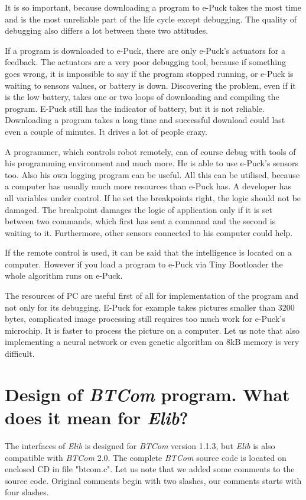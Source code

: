 	It is so important, because downloading a program to e-Puck takes the most time and is the most 
	unreliable part of the life cycle except debugging.
	The quality of debugging also differs a lot between these two attitudes.
	 
	If a program is downloaded to e-Puck, there are only e-Puck's actuators for a feedback.
	The actuators are a very poor debugging tool, because if something goes wrong, 
	it is impossible to say if the program stopped running,
	or e-Puck is waiting to sensors values, or battery is down. 
	Discovering the problem, even if it is the low battery, takes one or two loops of downloading and compiling the program.
	E-Puck still has the indicator of battery, but it is not reliable.
	Downloading a program takes a long time and successful download could last even a couple of minutes. 
	It drives a lot of people crazy.
	 
	A programmer, which controls robot remotely, can of course debug with tools of his programming environment and much more.
	He is able to use e-Puck's sensors too. Also his own logging program can be useful. 
	All this can be utilised, because a computer has usually much more resources than e-Puck has.
	A developer has all variables under control. If he set the breakpoints
	right, the logic should not be damaged. 
	The breakpoint damages the logic of application only if it is set between two commands,
	which first has sent a command and the second is waiting to it.
	Furthermore, other sensors connected to his computer could help.
	
	If the remote control is used, it can be said that the intelligence 
	is located on a computer. However if you load a program to e-Puck via Tiny Bootloader the whole algorithm
	runs on e-Puck.
	 
	The resources of PC are useful first of all for implementation of the program and not only for
	its debugging. E-Puck for example takes pictures smaller than 3200 bytes, complicated image processing still
	requires too much work for e-Puck's microchip. It is faster to process the picture
	on a computer. Let us note that also implementing a neural network or even genetic algorithm on 8kB memory
	is very difficult.
\section{Design of {\it BTCom} program. What does it mean for {\it Elib}?}
	\label{sec:btcomdesign}
	The interfaces of {\it Elib} is designed for {\it BTCom} version 1.1.3, but {\it Elib} is also compatible with {\it BTCom} 2.0.
	The complete {\it BTCom} source code is located on enclosed CD in file "btcom.c".
	Let us note that we added some comments to the source code. Original comments begin with two slashes,
	our comments starts with four slashes.

